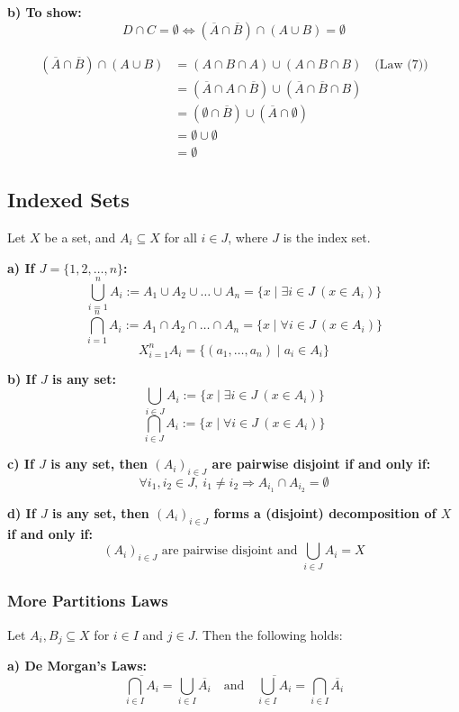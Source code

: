 \textbf{b) To show:} 
\[
D \cap C = \emptyset \iff (\overline{A} \cap \overline{B}) \cap (A \cup B) = \emptyset
\]

\begin{align*}
(\overline{A} \cap \overline{B}) \cap (A \cup B)
&= (A \cap B \cap A) \cup (A \cap B \cap B) \quad \text{(Law (7))} \\
&= (\overline{A} \cap A \cap \overline{B}) \cup (\overline{A} \cap \overline{B} \cap B) \\
&= (\emptyset \cap \overline{B}) \cup (\overline{A} \cap \emptyset) \\
&= \emptyset \cup \emptyset \\
&= \emptyset
\end{align*}

\subsection{Indexed Sets}
Let \( X \) be a set, and \( A_i \subseteq X \) for all \( i \in J \), where \( J \) is the index set.

\textbf{a) If \( J = \{1, 2, \dots, n\} \):}
\[
\bigcup_{i=1}^{n} A_i := A_1 \cup A_2 \cup \dots \cup A_n = \{ x \mid \exists i \in J \ (x \in A_i) \}
\]
\[
\bigcap_{i=1}^{n} A_i := A_1 \cap A_2 \cap \dots \cap A_n = \{ x \mid \forall i \in J \ (x \in A_i) \}
\]
\[
X_{i=1}^{n} A_i = \{(a_1, \dots, a_n) \mid a_i \in A_i \}
\]

\textbf{b) If \( J \) is any set:}
\[
\bigcup_{i \in J} A_i := \{ x \mid \exists i \in J \ (x \in A_i) \}
\]
\[
\bigcap_{i \in J} A_i := \{ x \mid \forall i \in J \ (x \in A_i) \}
\]

\textbf{c) If \( J \) is any set, then \( (A_i)_{i \in J} \) are pairwise disjoint if and only if:}
\[
\forall i_1, i_2 \in J, \ i_1 \neq i_2 \Rightarrow A_{i_1} \cap A_{i_2} = \emptyset
\]

\textbf{d) If \( J \) is any set, then \( (A_i)_{i \in J} \) forms a (disjoint) decomposition of \( X \) if and only if:}
\[
(A_i)_{i \in J} \text{ are pairwise disjoint and } \bigcup_{i \in J} A_i = X
\]

\subsubsection{More Partitions Laws}
Let \( A_i, B_j \subseteq X \) for \( i \in I \) and \( j \in J \). Then the following holds:

\textbf{a) De Morgan's Laws:}
\[
\overline{\bigcap_{i \in I} A_i}= \bigcup_{i \in I} \overline{A_i} \quad \text{and} \quad \overline{\bigcup_{i \in I} A_i} = \bigcap_{i \in I} \overline{A_i}
\]

